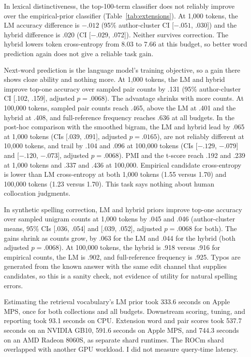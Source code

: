 \documentclass[11pt]{article}
\begin{document}
In lexical distinctiveness, the top-100-term classifier does not reliably
improve over the empirical-prior classifier (Table~\ref{tab:extensions}). At
1,000 tokens, the LM accuracy difference is $-.012$ (95\% author-cluster CI
[$-.051$, .030]) and the hybrid difference is .020 (CI [$-.029$, .072]).
Neither survives correction. The hybrid lowers token cross-entropy from 8.03 to
7.66 at this budget, so better word prediction again does not give a reliable
task gain.

Next-word prediction is the language model's training objective, so a gain
there shows cloze ability and nothing more. At 1,000 tokens, the LM and hybrid
improve top-one accuracy over sampled pair counts by .131 (95\% author-cluster
CI [.102, .159], adjusted $p=.0068$). The advantage shrinks with more counts.
At 100,000 tokens, sampled pair counts reach .465, above the LM at .401 and the
hybrid at .408, and full-reference frequency reaches .636 at all budgets. In
the post-hoc comparison with the smoothed bigram, the LM and hybrid lead by
.065 at 1,000 tokens (CIs [.039, .091], adjusted $p=.0165$), are not reliably
different at 10,000 tokens, and trail by .104 and .096 at 100,000 tokens (CIs
[$-.129$, $-.079$] and [$-.120$, $-.073$], adjusted $p=.0068$). PMI and the
t-score reach .192 and .239 at 1,000 tokens and .337 and .436 at 100,000.
Empirical candidate cross-entropy is lower than LM cross-entropy at both 1,000
tokens (1.55 versus 1.70) and 100,000 tokens (1.23 versus 1.70). This task says
nothing about human collocation judgments.

In synthetic spelling correction, LM and hybrid priors improve top-one
accuracy over sampled unigram counts at 1,000 tokens by .045 and .046
(author-cluster means, 95\% CIs [.036, .054] and [.039, .052], adjusted $p=.0068$ for both).
The gains shrink as counts grow, by .063 for the LM and .044 for the hybrid
(both adjusted $p=.0068$). At 100,000 tokens, the hybrid is .918 versus .916
for empirical counts, the LM is .902, and full-reference frequency is .925.
Typos are generated from the known answer with the same edit channel that
supplies candidates, so this is a sanity check, not evidence of utility for
natural spelling errors.

Estimating the retrieval vocabulary's LM prior took 333.6 seconds on Apple
MPS, once for both collections and all budgets. Downstream scoring, tuning,
and reporting took 93.1 seconds on CPU. Extension word and pair scores took
537.7 seconds on an NVIDIA GB10, 591.6 seconds on Apple MPS, and 744.3 seconds
on an AMD Radeon 8060S, as separate shard runtimes. The ROCm shard overlapped
with another GPU workload. I did not measure query-time latency.
\end{document}
